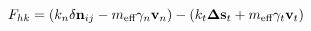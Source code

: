 \documentclass[12pt]{article}
\begin{document}
$$
   F_{hk} = (k_n \delta \mathbf{n}_{ij} -  
   m_{\mbox{\scriptsize{eff}}} \gamma_n\mathbf{ v}_n) - 
   (k_t \mathbf{ \Delta s}_t +
   m_{\mbox{\scriptsize{eff}}} \gamma_t \mathbf{v}_t)
$$
\end{document}
